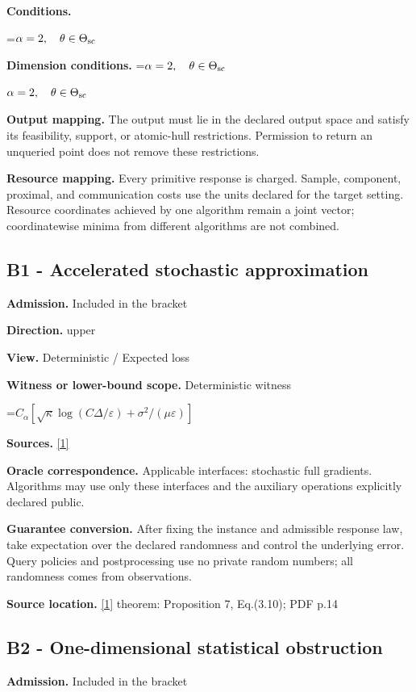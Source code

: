 \documentclass[10pt,a4paper]{article}
\newcommand{\AtlasMath}[1]{\par\begingroup\centering\setbox0=\hbox{$\displaystyle #1$}\ifdim\wd0>1.4\linewidth\typeout{ATLAS WIDE FORMULA: \the\wd0}\fi\ifdim\wd0>\linewidth\resizebox{\linewidth}{!}{\box0}\else\box0\fi\par\endgroup}
\newcommand{\AtlasInlineMath}[1]{\begingroup\setbox0=\hbox{$#1$}\ifdim\wd0>.4\linewidth\endgroup\AtlasMath{#1}\else\endgroup$#1$\fi}
\begin{document}
\textbf{Conditions.} 
\AtlasMath{\alpha=2,\quad\theta\in\Theta_{\rm sc}}


\textbf{Dimension conditions.} \AtlasInlineMath{\alpha=2,\quad\theta\in\Theta_{\rm sc}}

\textbf{Output mapping.} The output must lie in the declared output space and satisfy its feasibility, support, or atomic-hull restrictions. Permission to return an unqueried point does not remove these restrictions.

\textbf{Resource mapping.} Every primitive response is charged. Sample, component, proximal, and communication costs use the units declared for the target setting. Resource coordinates achieved by one algorithm remain a joint vector; coordinatewise minima from different algorithms are not combined.

\subsection{B1 - Accelerated stochastic approximation}
\textbf{Admission.} Included in the bracket

\textbf{Direction.} upper

\textbf{View.} Deterministic / Expected loss

\textbf{Witness or lower-bound scope.} Deterministic witness

\AtlasMath{C_\alpha[\sqrt\kappa\log(C\Delta/\varepsilon)+\sigma^2/(\mu\varepsilon)]}
\textbf{Sources.} \href{https://optimization-online.org/wp-content/uploads/2012/06/3508.pdf}{[1]}

\textbf{Oracle correspondence.} Applicable interfaces: stochastic full gradients. Algorithms may use only these interfaces and the auxiliary operations explicitly declared public.

\textbf{Guarantee conversion.} After fixing the instance and admissible response law, take expectation over the declared randomness and control the underlying error. Query policies and postprocessing use no private random numbers; all randomness comes from observations.

\textbf{Source location.} \href{https://optimization-online.org/wp-content/uploads/2012/06/3508.pdf}{[1]} theorem: Proposition 7, Eq.(3.10); PDF p.14

\subsection{B2 - One-dimensional statistical obstruction}
\textbf{Admission.} Included in the bracket
\end{document}
